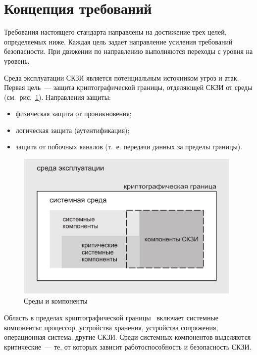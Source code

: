 \section{Концепция требований}\label{COMMON.Concept}

Требования настоящего стандарта направлены на достижение трех целей, 
определяемых ниже. Каждая цель задает направление усиления
требований безопасности. При движении по направлению выполняются переходы с
уровня на уровень.

Среда эксплуатации СКЗИ является потенциальным источником угроз и атак. 
%
%
Первая цель~--- защита криптографической границы, отделяющей СКЗИ от среды
(см.~рис.~\ref{Fig.COMMON.Concept}).
%
Направления защиты:
\begin{itemize}
\item
физическая защита от проникновения;
\item
логическая защита (аутентификация);
\item
защита от побочных каналов (т.~е. передачи данных за пределы границы).
\end{itemize}

\begin{figure}[bht]
\begin{center}
\includegraphics[width=11cm]{../figs/env}
\end{center}
\caption{Среды и компоненты}\label{Fig.COMMON.Concept}
\end{figure}

Область в пределах криптографической границы~
включает системные компоненты: процессор, устройства хранения, 
устройства сопряжения, операционная система, другие СКЗИ. 
%
Среди системных компонентов выделяются критические~--- те, от которых зависит  
работоспособность и безопасность СКЗИ. 

